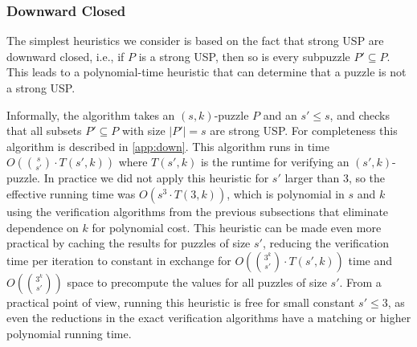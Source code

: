 \documentclass[11pt]{article}
\newcommand\sse{\subseteq}
\begin{document}
\subsubsection{Downward Closed}

The simplest heuristics we consider is based on the fact that
strong USP are downward closed, i.e., if $P$ is a strong USP, then
so is every subpuzzle $P' \sse P$.  This leads to a polynomial-time heuristic
that can determine that a puzzle is not a strong USP.

Informally, the algorithm takes an $(s,k)$-puzzle $P$ and an $s' \le
s$, and checks that all subsets $P' \subseteq P$ with size $|P'| = s$
are strong USP.  For completeness this algorithm is described in
\autoref{app:down}.  This algorithm runs in time $O(\binom{s}{s'}\cdot
T(s', k))$ where $T(s',k)$ is the runtime for
verifying an $(s',k)$-puzzle.  In practice we did not apply this
heuristic for $s'$ larger than $3$, so the effective running time was
$O(s^3 \cdot T(3,k))$, which is polynomial in $s$ and $k$ using the
verification algorithms from the previous subsections that eliminate
dependence on $k$ for polynomial cost.  This heuristic can be made
even more practical by caching the results for puzzles of size $s'$,
reducing the verification time per iteration to constant in exchange
for $O(\binom{3^k}{s'}\cdot T(s',k))$ time and $O(\binom{3^k}{s'})$ space to precompute the values for all
puzzles of size $s'$.
From a practical point of view, running this heuristic
is free for small constant $s' \le 3$, as even the reductions in the exact verification algorithms
have a matching or higher polynomial running time.

\end{document}
